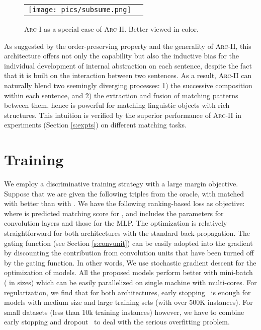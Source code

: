 \documentclass{article} \usepackage{nips14submit_e,times}
\newcommand{\0}{\ensuremath{\mathbf{0}}}
\newcommand{\1}{\ensuremath{\mathbf{1}}}
\begin{document}
\begin{figure}[h!]
\begin{center}
    \begin{tabular}[c]{cc}
\texttt{[image: pics/subsume.png]}
      \hspace{160pt}
\end{tabular}
\vspace{-10pt}
    \caption{\textsc{Arc-I} as a special case of \textsc{Arc-II}. Better viewed in color.}
    \label{f:specialcase}
  \end{center}
\end{figure}
\newpage
As suggested by the order-preserving property and the generality of \textsc{Arc-II}, this architecture offers not only the capability but also the inductive bias for the individual development of internal abstraction on each sentence, despite the fact that it is built on the interaction between two sentences. As a result, \textsc{Arc-II} can naturally blend two seemingly diverging processes: 1) the successive composition within each sentence, and 2) the extraction and fusion of matching patterns between them, hence is powerful for matching linguistic objects with rich structures. This intuition is verified by the superior performance of \textsc{Arc-II} in experiments (Section \ref{s:expts}) on different matching tasks.

\section{Training}  \label{s:opt} \vspace{-10pt}

We employ a discriminative training strategy with a large margin objective. Suppose that we are given the following triples  from the oracle, with  matched with  better than with .  We have the following ranking-based loss as objective:
{\small
}
where  is predicted matching score for , and  includes the parameters for convolution layers and those for the MLP. The optimization is relatively straightforward for both architectures with the standard back-propagation. The gating function (see Section \ref{s:convunit}) can be easily adopted into the gradient by discounting the contribution from convolution units that have been turned off by the gating function. In other words,
We use stochastic gradient descent for the optimization of models.  All the proposed models perform better with mini-batch ( in sizes) which can be easily parallelized on single machine with multi-cores.
For regularization, we find that for both architectures, early stopping~\cite{earlystoping} is enough for models with medium size and large training sets (with over 500K instances). For small datasets (less than 10k training instances) however, we have to combine early stopping and dropout~\cite{dropout} to deal with the serious overfitting problem. \hspace{-10pt}
\end{document}
